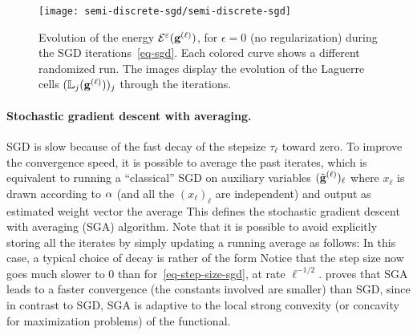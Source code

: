 \begin{figure}[h!]
\centering
\texttt{[image: semi-discrete-sgd/semi-discrete-sgd]}
\caption{\label{fig-semi-discrete-sgd}
Evolution of the energy $\mathcal{E}^\varepsilon(\mathrm{\textbf{g}}^{(\ell)})$, for $\epsilon=0$ (no regularization) during the SGD iterations~\eqref{eq-sgd}. Each colored curve shows a different randomized run.
%
The images display the evolution of the Laguerre cells $( \mathbb{L}_{j}(\mathrm{\textbf{g}}^{(\ell)}) )_j$ through the iterations. 
}
\end{figure}

\paragraph{Stochastic gradient descent with averaging.}

SGD is slow because of the fast decay of
the stepsize $\tau_\ell$ toward zero.
%
To improve the convergence speed, it is possible to average the past
iterates, which is equivalent to running a ``classical'' SGD on auxiliary variables $(\tilde{\mathrm{\textbf{g}}}^{(\ell)})_\ell$
where $x_\ell$ is drawn according to $\alpha$ (and all the $(x_\ell)_\ell$ are independent)
and output as estimated weight vector the average
This defines the stochastic gradient descent with averaging (SGA)
algorithm.
%
Note that it is possible to avoid explicitly storing all the iterates by simply
updating a running average as follows:
%
In this case, a typical choice of decay is rather of the form 
Notice that the step size now goes much slower to 0 than for~\eqref{eq-step-size-sgd}, at rate $\ell^{-1/2}$.
%
\citet{bach2014adaptivity} proves that SGA leads to a faster convergence (the constants involved are smaller) than SGD, since in contrast to SGD, SGA is adaptive to the local strong convexity (or concavity for maximization problems) of the functional.




